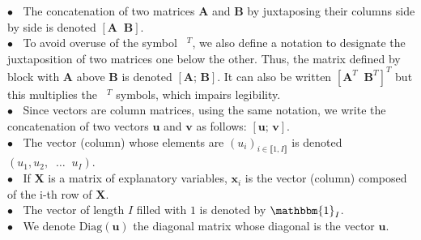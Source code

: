 \documentclass[preprint,12pt]{elsarticle}
\begin{document}
\noindent $\bullet \; \;$ The concatenation of two matrices $\mathbf{A}$ and $\mathbf{B}$ by juxtaposing their columns side by side is denoted $[\mathbf{A} \; \; \mathbf{B}]$.\\
$\bullet \; \;$ To avoid overuse of the symbol $\phantom{a}^T$, we also define a notation to designate the juxtaposition of two matrices one below the other. Thus, the matrix defined by block with $\mathbf{A}$ above $\mathbf{B}$ is denoted $\left[\mathbf{A}; \, \mathbf{B}\right]$. It can also be written $[\mathbf{A}^T \; \; \mathbf{B}^T]^T$ but this multiplies the $\phantom{a}^T$ symbols, which impairs legibility. \\
$\bullet \; \;$ Since vectors are column matrices, using the same notation, we write the concatenation of two vectors $\mathbf{u}$ and $\mathbf{v}$ as follows: $[\mathbf{u}; \, \mathbf{v}]$.  \\
$\bullet \; \;$ The vector (column) whose elements are $(u_i)_{i \in \llbracket 1, I\rrbracket}$ is denoted $(u_1, u_2, \; \; \hdots \;\; u_I)$. \\
$\bullet \; \;$ If $\mathbf{X}$ is a matrix of explanatory variables, $\mathbf{x}_i$ is the vector (column) composed of the i-th row of $\mathbf{X}$.\\
$\bullet \; \;$ The vector of length $I$ filled with $1$ is denoted by $\mathbbm{1}_I$.\\
$\bullet \; \;$ We denote $\text{Diag}(\mathbf{u})$ the diagonal matrix whose diagonal is the vector $\mathbf{u}$. \\

\end{document}
